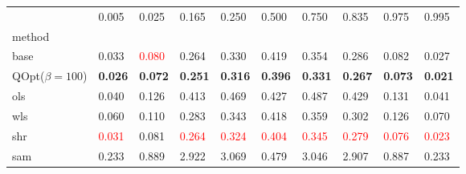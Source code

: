 \begin{tabular}{llllllllll}
\toprule
 & 0.005 & 0.025 & 0.165 & 0.250 & 0.500 & 0.750 & 0.835 & 0.975 & 0.995 \\
method &  &  &  &  &  &  &  &  &  \\
\midrule
base & 0.033 & \textcolor{red}{0.080} & 0.264 & 0.330 & 0.419 & 0.354 & 0.286 & 0.082 & 0.027 \\
\midrule
QOpt($\beta=100$) & \textbf{0.026} & \textbf{0.072} & \textbf{0.251} & \textbf{0.316} & \textbf{0.396} & \textbf{0.331} & \textbf{0.267} & \textbf{0.073} & \textbf{0.021} \\
ols & 0.040 & 0.126 & 0.413 & 0.469 & 0.427 & 0.487 & 0.429 & 0.131 & 0.041 \\
wls & 0.060 & 0.110 & 0.283 & 0.343 & 0.418 & 0.359 & 0.302 & 0.126 & 0.070 \\
shr & \textcolor{red}{0.031} & 0.081 & \textcolor{red}{0.264} & \textcolor{red}{0.324} & \textcolor{red}{0.404} & \textcolor{red}{0.345} & \textcolor{red}{0.279} & \textcolor{red}{0.076} & \textcolor{red}{0.023} \\
sam & 0.233 & 0.889 & 2.922 & 3.069 & 0.479 & 3.046 & 2.907 & 0.887 & 0.233 \\
\bottomrule
\end{tabular}